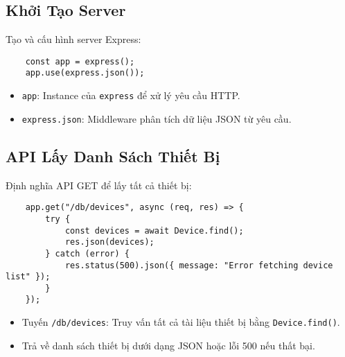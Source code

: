         \subsection{Khởi Tạo Server}
            \hspace*{0.6cm}Tạo và cấu hình server Express:
            \begin{lstlisting}
    const app = express();
    app.use(express.json());
            \end{lstlisting}
            \begin{itemize}
                \item \texttt{app}: Instance của \texttt{express} để xử lý yêu cầu HTTP.
                \item \texttt{express.json}: Middleware phân tích dữ liệu JSON từ yêu cầu.
            \end{itemize}

        \subsection{API Lấy Danh Sách Thiết Bị}
            \hspace*{0.6cm}Định nghĩa API GET để lấy tất cả thiết bị:
            \begin{lstlisting}
    app.get("/db/devices", async (req, res) => {
        try {
            const devices = await Device.find();
            res.json(devices);
        } catch (error) {
            res.status(500).json({ message: "Error fetching device list" });
        }
    });
            \end{lstlisting}
            \begin{itemize}
                \item Tuyến \texttt{/db/devices}: Truy vấn tất cả tài liệu thiết bị bằng \texttt{Device.find()}.
                \item Trả về danh sách thiết bị dưới dạng JSON hoặc lỗi 500 nếu thất bại.
            \end{itemize}

